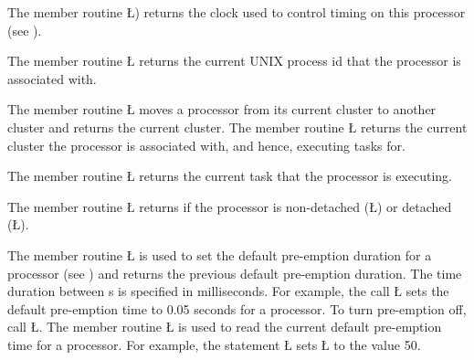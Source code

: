 \documentclass[openright,twoside]{report}
\begin{document}
The member routine \LGinlinetrue\LGbegin\lgrinde\L{}\endlgrinde\LGend{}) returns the clock used to control timing on this processor (see ).

The member routine \LGinlinetrue\LGbegin\lgrinde\L{}\endlgrinde\LGend{} returns the current UNIX process id that the processor is associated with.

The member routine \LGinlinetrue\LGbegin\lgrinde\L{}\endlgrinde\LGend{} moves a processor from its current cluster to another cluster and returns the current cluster.
The member routine \LGinlinetrue\LGbegin\lgrinde\L{}\endlgrinde\LGend{} returns the current cluster the processor is associated with, and hence, executing tasks for.

The member routine \LGinlinetrue\LGbegin\lgrinde\L{}\endlgrinde\LGend{} returns the current task that the processor is executing.

The member routine \LGinlinetrue\LGbegin\lgrinde\L{}\endlgrinde\LGend{} returns if the processor is non-detached (\LGinlinetrue\LGbegin\lgrinde\L{}\endlgrinde\LGend{}) or detached (\LGinlinetrue\LGbegin\lgrinde\L{}\endlgrinde\LGend{}).

The member routine \LGinlinetrue\LGbegin\lgrinde\L{}\endlgrinde\LGend{} is used to set the default pre-emption duration for a processor (see ) and returns the previous default pre-emption duration.
The time duration between s is specified in milliseconds.
For example, the call \LGinlinetrue\LGbegin\lgrinde\L{}\endlgrinde\LGend{} sets the default pre-emption time to 0.05 seconds for a processor.
To turn pre-emption off, call \LGinlinetrue\LGbegin\lgrinde\L{}\endlgrinde\LGend{}.
The member routine \LGinlinetrue\LGbegin\lgrinde\L{}\endlgrinde\LGend{} is used to read the current default pre-emption time for a processor.
For example, the statement \LGinlinetrue\LGbegin\lgrinde\L{}\endlgrinde\LGend{} sets \LGinlinetrue\LGbegin\lgrinde\L{}\endlgrinde\LGend{} to the value 50.
\end{document}

